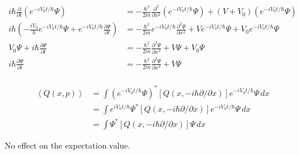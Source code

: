 \documentclass{article}
\newcommand{\ev}[1]{\left< #1 \right>}
\begin{document}
\begin{align*}
  i \hbar \frac{\partial}{\partial t} \left( e^{-i V_0 t / \hbar} \Psi \right)                                                  & = -\frac{\hbar^2}{2 m} \frac{\partial^2}{\partial x^2} \left( e^{-i V_0 t / \hbar} \Psi \right) + (V + V_0) \left( e^{-i V_0 t / \hbar} \Psi \right) \\
  i \hbar \left( -\frac{i V_0}{\hbar} e^{-i V_0 t / \hbar} \Psi + e^{-i V_0 t / \hbar} \frac{\partial \Psi}{\partial t} \right) & = -\frac{\hbar^2}{2 m} e^{-i V_0 t / \hbar} \frac{\partial^2 \Psi}{\partial x^2} + V e^{-i V_0 t / \hbar} \Psi + V_0 e^{-i V_0 t / \hbar} \Psi       \\
  V_0 \Psi + i \hbar \frac{\partial \Psi}{\partial t}                                                                           & = -\frac{\hbar^2}{2 m} \frac{\partial^2 \Psi}{\partial x^2} + V \Psi + V_0 \Psi                                                                      \\
  i \hbar \frac{\partial \Psi}{\partial t}                                                                                      & = -\frac{\hbar^2}{2 m} \frac{\partial^2 \Psi}{\partial x^2} + V \Psi                                                                                 \\
\end{align*}

\begin{align*}
  \ev{Q(x, p)} & = \int \left( e^{-i V_0 t / \hbar} \Psi \right)^* \left[ Q(x, -i \hbar \partial / \partial x) \right] e^{-i V_0 t / \hbar} \Psi \,d x \\
               & = \int e^{i V_0 t / \hbar} \Psi^* \left[ Q(x, -i \hbar \partial / \partial x) \right] e^{-i V_0 t / \hbar} \Psi \,d x                 \\
               & = \int \Psi^* [Q(x, -i \hbar \partial / \partial x)] \Psi \,d x
\end{align*}

No effect on the expectation value.

\subsection{}
\end{document}
